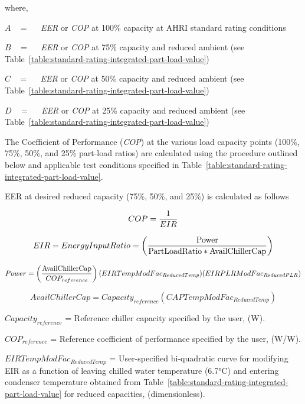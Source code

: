 where,

\(A\) ~ = ~~ \emph{EER} or \emph{COP} at 100\% capacity at AHRI standard rating conditions

\(B\) ~ = ~~ \emph{EER} or \emph{COP} at 75\% capacity and reduced ambient (see Table~\ref{table:standard-rating-integrated-part-load-value})

\(C\) ~ = ~~ \emph{EER} or \emph{COP} at 50\% capacity and reduced ambient (see Table~\ref{table:standard-rating-integrated-part-load-value})

\(D\) ~ = ~~ \emph{EER} or \emph{COP} at 25\% capacity and reduced ambient (see Table~\ref{table:standard-rating-integrated-part-load-value})

The Coefficient of Performance (\emph{COP}) at the various load capacity points (100\%, 75\%, 50\%, and 25\% part-load ratios) are calculated using the procedure outlined below and applicable test conditions specified in Table~\ref{table:standard-rating-integrated-part-load-value}.

EER at desired reduced capacity (75\%, 50\%, and 25\%) is calculated as follows

\begin{equation}
COP = \frac{{\rm{1}}}{{EIR}}
\end{equation}

\begin{equation}
EIR = EnergyInputRatio = \left( {\frac{{{\rm{Power }}}}{{{\rm{PartLoadRatio * AvailChillerCap}}}}} \right)
\end{equation}

\begin{equation}
Power = \left( {\frac{{{\rm{AvailChillerCap}}}}{{CO{P_{reference}}}}} \right)(EIRTempModFa{c_{ReducedTemp}})(EIRPLRModFa{c_{ReducedPLR}})
\end{equation}

\begin{equation}
AvailChillerCap = Capacit{y_{reference}}(CAPTempModFa{c_{ReducedTemp}})
\end{equation}

\(Capacit{y_{reference}}\) = Reference chiller capacity specified by the user, (W).

\(CO{P_{reference}}\) = Reference coefficient of performance specified by the user, (W/W).

\(EIRTempModFa{c_{ReducedTemp}}\) = User-specified bi-quadratic curve for modifying EIR as a function of leaving chilled water temperature (6.7°C) and entering condenser temperature obtained from Table~\ref{table:standard-rating-integrated-part-load-value} for reduced capacities, (dimensionless).

